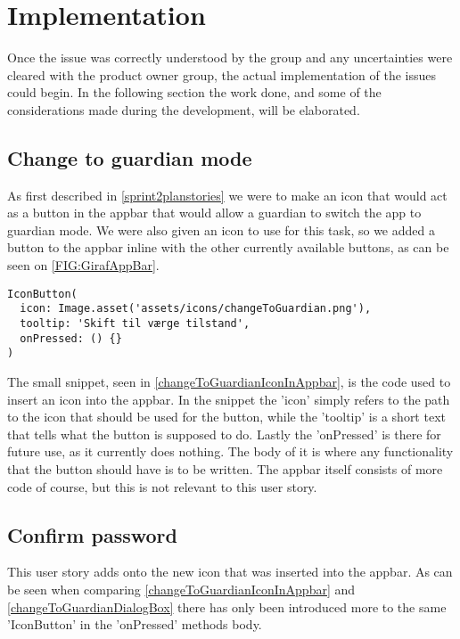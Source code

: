 \section{Implementation}
Once the issue was correctly understood by the group and any uncertainties were cleared with the product owner group, the actual implementation of the issues could begin. 
In the following section the work done, and some of the considerations made during the development, will be elaborated. 

\subsection{Change to guardian mode} \label{changeToGuardianIconImpl}
As first described in \autoref{sprint2planstories} we were to make an icon that would act as a button in the appbar that would allow a guardian to switch the app to guardian mode.
We were also given an icon to use for this task, so we added a button to the appbar inline with the other currently available buttons, as can be seen on \autoref{FIG:GirafAppBar}.


\begin{lstlisting}[caption={The code used to insert the change to guardian icon in the appbar}, captionpos=b, label=changeToGuardianIconInAppbar]
IconButton(
  icon: Image.asset('assets/icons/changeToGuardian.png'),
  tooltip: 'Skift til værge tilstand',
  onPressed: () {}
)
\end{lstlisting}

The small snippet, seen in \autoref{changeToGuardianIconInAppbar}, is the code used to insert an icon into the appbar.
In the snippet the 'icon' simply refers to the path to the icon that should be used for the button, while the 'tooltip' is a short text that tells what the button is supposed to do.
Lastly the 'onPressed' is there for future use, as it currently does nothing.
The body of it is where any functionality that the button should have is to be written.
The appbar itself consists of more code of course, but this is not relevant to this user story.

\subsection{Confirm password} \label{changeToGuardianDialogBoxImpl}
This user story adds onto the new icon that was inserted into the appbar.
As can be seen when comparing \autoref{changeToGuardianIconInAppbar} and \autoref{changeToGuardianDialogBox} there has only been introduced more to the same 'IconButton' in the 'onPressed' methods body.

